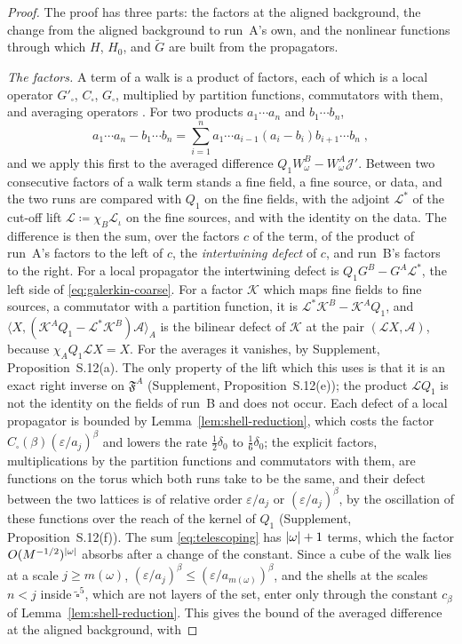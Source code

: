\documentclass[11pt]{preprint}
\DeclarePairedDelimiter{\abs}{\lvert}{\rvert}
\numberwithin{equation}{section}
\theoremstyle{definition}
\theoremstyle{remark}
\theoremstyle{plain}
\begin{document}
\begin{proof}
The proof has three parts: the factors at the aligned background, the change from the aligned background to run~A's own, and the nonlinear functions through which $H$, $H_0$, and $\tilde G$ are built from the propagators.

\emph{The factors.} A term of a walk is a product of factors, each of which is a local operator $G'_\square$, $C_\square$, $G_\square$, multiplied by partition functions, commutators with them, and averaging operators \cite[pp.~409--416]{BalabanPBG}. For two products $a_1\cdots a_n$ and $b_1\cdots b_n$,
\begin{equation}\label{eq:telescoping}
    a_1\cdots a_n - b_1\cdots b_n = \sum_{i=1}^{n}a_1\cdots a_{i-1}(a_i - b_i)b_{i+1}\cdots b_n\;,
\end{equation}
and we apply this first to the averaged difference $Q_1W^B_\omega - W^A_\omega\mathcal J'$. Between two consecutive factors of a walk term stands a fine field, a fine source, or data, and the two runs are compared with $Q_1$ on the fine fields, with the adjoint $\mathcal L^*$ of the cut-off lift $\mathcal L \coloneqq \chi_B\mathcal L_\iota$ on the fine sources, and with the identity on the data. The difference is then the sum, over the factors $c$ of the term, of the product of run~A's factors to the left of $c$, the \emph{intertwining defect} of $c$, and run~B's factors to the right. For a local propagator the intertwining defect is $Q_1G^B - G^A\mathcal L^*$, the left side of \eqref{eq:galerkin-coarse}. For a factor $\mathcal K$ which maps fine fields to fine sources, a commutator with a partition function, it is $\mathcal L^*\mathcal K^B - \mathcal K^AQ_1$, and $\langle X, (\mathcal K^AQ_1 - \mathcal L^*\mathcal K^B)\mathcal A\rangle_A$ is the bilinear defect of $\mathcal K$ at the pair $(\mathcal LX, \mathcal A)$, because $\chi_AQ_1\mathcal LX = X$. For the averages it vanishes, by Supplement, Proposition~S.12(a). The only property of the lift which this uses is that it is an exact right inverse on $\mathfrak F^A$ (Supplement, Proposition~S.12(e)); the product $\mathcal LQ_1$ is not the identity on the fields of run~B and does not occur. Each defect of a local propagator is bounded by Lemma~\ref{lem:shell-reduction}, which costs the factor $C_\square(\beta)(\varepsilon/a_j)^\beta$ and lowers the rate $\frac12\delta_0$ to $\frac16\delta_0$; the explicit factors, multiplications by the partition functions and commutators with them, are functions on the torus which both runs take to be the same, and their defect between the two lattices is of relative order $\varepsilon/a_j$ or $(\varepsilon/a_j)^\beta$, by the oscillation of these functions over the reach of the kernel of $Q_1$ (Supplement, Proposition~S.12(f)). The sum \eqref{eq:telescoping} has $\abs{\omega} + 1$ terms, which the factor $O(M^{-1/2})^{\abs{\omega}}$ absorbs after a change of the constant. Since a cube of the walk lies at a scale $j \geq m(\omega)$, $(\varepsilon/a_j)^\beta \leq (\varepsilon/a_{m(\omega)})^\beta$, and the shells at the scales $n < j$ inside $\tilde\square^5$, which are not layers of the set, enter only through the constant $c_\beta$ of Lemma~\ref{lem:shell-reduction}. This gives the bound of the averaged difference at the aligned background, with 
\end{proof}
\end{document}
